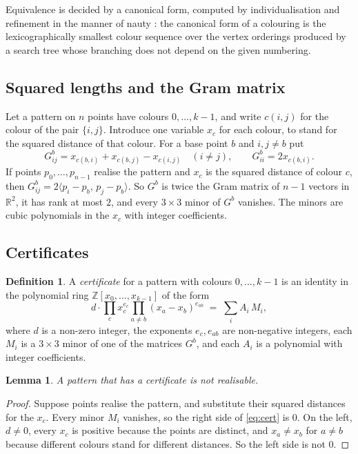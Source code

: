 \documentclass[11pt]{amsart}
\newtheorem{lemma}[theorem]{Lemma}
\theoremstyle{definition}
\newtheorem{definition}[theorem]{Definition}
\theoremstyle{remark}
\newcommand{\R}{\mathbb{R}}
\newcommand{\Z}{\mathbb{Z}}
\begin{document}
Equivalence is decided by a canonical form, computed by individualisation and refinement in the manner of
nauty \cite{MP}: the canonical form of a colouring is the lexicographically smallest colour sequence over
the vertex orderings produced by a search tree whose branching does not depend on the given numbering.

\subsection{Squared lengths and the Gram matrix}
Let a pattern on $n$ points have colours $0,\dots,k-1$, and write $c(i,j)$ for the colour of the pair
$\{i,j\}$. Introduce one variable $x_c$ for each colour, to stand for the squared distance of that colour.
For a base point $b$ and $i,j\neq b$ put
\[
  G^b_{ij}=x_{c(b,i)}+x_{c(b,j)}-x_{c(i,j)}\quad(i\neq j),\qquad G^b_{ii}=2x_{c(b,i)}.
\]
If points $p_0,\dots,p_{n-1}$ realise the pattern and $x_c$ is the squared distance of colour $c$, then
$G^b_{ij}=2\langle p_i-p_b,\,p_j-p_b\rangle$. So $G^b$ is twice the Gram matrix of $n-1$ vectors in $\R^2$,
it has rank at most $2$, and every $3\times3$ minor of $G^b$ vanishes. The minors are cubic polynomials in
the $x_c$ with integer coefficients.

\subsection{Certificates}

\begin{definition}\label{def:cert}
A \emph{certificate} for a pattern with colours $0,\dots,k-1$ is an identity in the
polynomial ring $\Z[x_0,\dots,x_{k-1}]$ of the form
\begin{equation}\label{eq:cert}
  d\cdot\prod_{c}x_c^{e_c}\prod_{a\neq b}(x_a-x_b)^{e_{ab}} \;=\; \sum_{i}A_i\,M_i,
\end{equation}
where $d$ is a non-zero integer, the exponents $e_c,e_{ab}$ are non-negative integers, each $M_i$ is a
$3\times3$ minor of one of the matrices $G^b$, and each $A_i$ is a polynomial with integer coefficients.
\end{definition}

\begin{lemma}\label{lem:cert}
A pattern that has a certificate is not realisable.
\end{lemma}

\begin{proof}
Suppose points realise the pattern, and substitute their squared distances for the $x_c$. Every minor
$M_i$ vanishes, so the right side of \eqref{eq:cert} is $0$. On the left, $d\neq0$, every $x_c$ is
positive because the points are distinct, and $x_a\neq x_b$ for $a\neq b$ because different colours stand
for different distances. So the left side is not $0$.
\end{proof}
\end{document}
